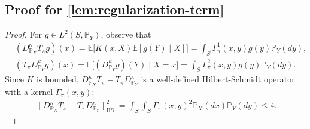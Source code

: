 \documentclass{article}
\begin{document}
\subsection{Proof for \cref{lem:regularization-term}}\label{pf:lem:regularization-term}
\begin{proof}
	For $g \in L^2(S,\mathbb{P}_Y)$, observe that
	\begin{align*}
		&(D_{\mathbb{P}_X}^{\kappa}T_{\pi}g)(x) = \mathbb{E}\Big[K(x,X)\mathbb{E}\left[g(Y) \mid X\right]\Big] = \int_S \Gamma_\pi^1(x,y)g(y)\mathbb{P}_Y(dy) , \\
		&(T_{\pi}D_{\mathbb{P}_Y}^{\kappa}g)(x) = \mathbb{E}\Big[(D_{\mathbb{P}_Y}^{\kappa}g)(Y) \mid X = x\Big] = \int_S \Gamma_\pi^2(x,y)g(y) \mathbb{P}_Y(dy) .
	\end{align*}
	Since $K$ is bounded, $D_{\mathbb{P}_X}^{\kappa}T_{\pi} - T_{\pi}D_{\mathbb{P}_Y}^{\kappa}$ is a well-defined Hilbert-Schmidt operator with a kernel $\Gamma_\pi(x,y)$:
	\begin{align*}
		\| D_{\mathbb{P}_X}^{\kappa}T_{\pi} - T_{\pi}D_{\mathbb{P}_Y}^{\kappa} \|_{\mathrm{HS}}^2 = \int_S\int_S \Gamma_\pi(x,y)^2\mathbb{P}_X(dx)\mathbb{P}_Y(dy) \leq 4 .
	\end{align*}
\end{proof}
\end{document}
